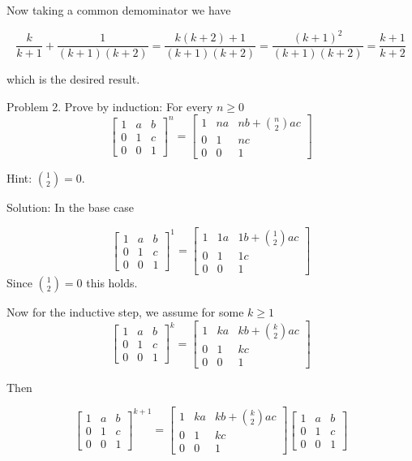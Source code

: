 \documentclass[16 pt]{amsart}
\theoremstyle{definition}
\theoremstyle{remark}
\numberwithin{equation}{subsection}
\begin{document}
Now taking a common demominator we have

\[
\frac{k}{k+1} + \frac{1}{(k+1)(k+2)} = \frac{k(k+2) + 1}{(k+1)(k+2)} = \frac{(k+1)^2}{(k+1)(k+2)} = \frac{k+1}{k+2}
\]

which is the desired result.

\newpage

Problem 2.
Prove by induction: For every $n\ge 0$
\[
\begin{bmatrix}
1 & a & b \\
0 & 1 & c \\
0 & 0 & 1
\end{bmatrix}^n = \begin{bmatrix}
1 & na & nb + {n \choose 2}ac \\
0 & 1 & nc \\
0 & 0 & 1
\end{bmatrix}
\]

Hint: ${1\choose 2}=0$.


\vspace{.5in}

Solution:  In the base case

\[
\begin{bmatrix}
1 & a & b \\
0 & 1 & c \\
0 & 0 & 1
\end{bmatrix}^1 = \begin{bmatrix}
1 & 1a & 1b + {1 \choose 2}ac \\
0 & 1 & 1c \\
0 & 0 & 1
\end{bmatrix}
\]
Since ${1 \choose 2} = 0$ this holds.

Now for the inductive step, we assume for some $k\ge 1$ 
\[
\begin{bmatrix}
1 & a & b \\
0 & 1 & c \\
0 & 0 & 1
\end{bmatrix}^k = \begin{bmatrix}
1 & ka & kb + {k \choose 2}ac \\
0 & 1 & kc \\
0 & 0 & 1
\end{bmatrix}
\]

Then

\[
\begin{bmatrix}
1 & a & b \\
0 & 1 & c \\
0 & 0 & 1
\end{bmatrix}^{k+1} = \begin{bmatrix}
1 & ka & kb + {k \choose 2}ac \\
0 & 1 & kc \\
0 & 0 & 1
\end{bmatrix} 
\begin{bmatrix}
1 & a & b \\
0 & 1 & c \\
0 & 0 & 1
\end{bmatrix}
\]
\end{document}
